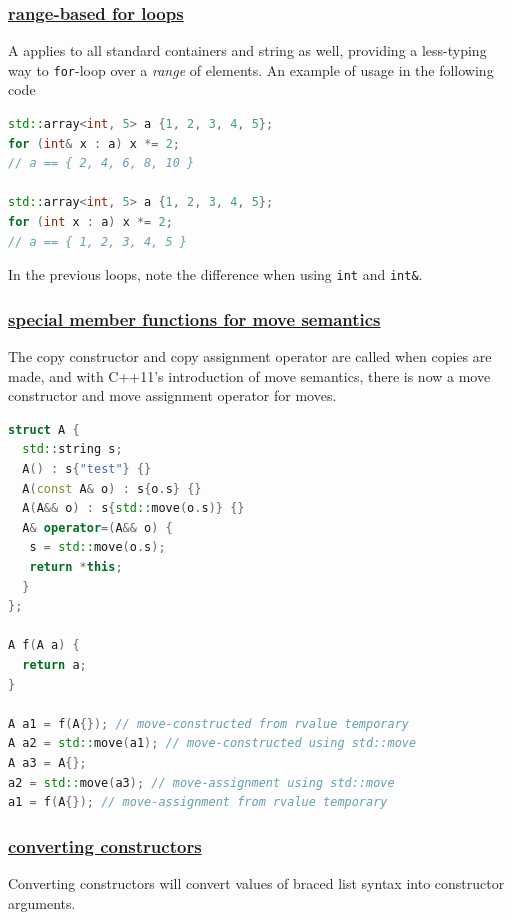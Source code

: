 \subsubsection{\href{https://github.com/AnthonyCalandra/modern-cpp-features/tree/master\#range-based-for-loops}
                    {range-based for loops}}
A  applies to all standard 
containers and string as well, providing a less-typing way to 
\texttt{for}-loop over a \textit{range} of elements.
\newline
An example of usage in the following code
\begin{lstlisting}[language=C++]
std::array<int, 5> a {1, 2, 3, 4, 5};
for (int& x : a) x *= 2;
// a == { 2, 4, 6, 8, 10 }

std::array<int, 5> a {1, 2, 3, 4, 5};
for (int x : a) x *= 2;
// a == { 1, 2, 3, 4, 5 }
\end{lstlisting}
In the previous loops, note the difference when using \texttt{int} and \texttt{int\&}.

\subsubsection{\href{https://github.com/AnthonyCalandra/modern-cpp-features/tree/master\#special-member-functions-for-move-semantics}
                    {special member functions for move semantics}}
The copy constructor and copy assignment operator are called when copies 
are made, and with C++11's introduction of move semantics, there is now 
a move constructor and move assignment operator for moves.

\begin{lstlisting}[language=C++]
struct A {
  std::string s;
  A() : s{"test"} {}
  A(const A& o) : s{o.s} {}
  A(A&& o) : s{std::move(o.s)} {}
  A& operator=(A&& o) {
   s = std::move(o.s);
   return *this;
  }
};

A f(A a) {
  return a;
}

A a1 = f(A{}); // move-constructed from rvalue temporary
A a2 = std::move(a1); // move-constructed using std::move
A a3 = A{};
a2 = std::move(a3); // move-assignment using std::move
a1 = f(A{}); // move-assignment from rvalue temporary
\end{lstlisting}

\subsubsection{\href{https://github.com/AnthonyCalandra/modern-cpp-features/tree/master\#converting-constructors}
                    {converting constructors}}
Converting constructors will convert values of braced list syntax into 
constructor arguments.

